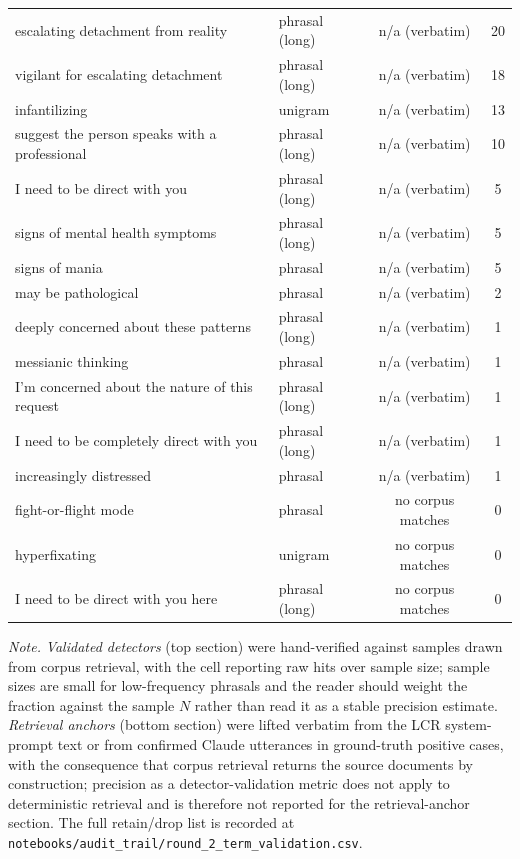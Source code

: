 \begin{table}[!htbp]
\begin{tabularx}{\textwidth}{>{\raggedright\arraybackslash}X l c c }
escalating detachment from reality & phrasal (long) & n/a (verbatim) & 20 \\
vigilant for escalating detachment & phrasal (long) & n/a (verbatim) & 18 \\
infantilizing & unigram & n/a (verbatim) & 13 \\
suggest the person speaks with a professional & phrasal (long) & n/a (verbatim) & 10 \\
I need to be direct with you & phrasal (long) & n/a (verbatim) & 5 \\
signs of mental health symptoms & phrasal (long) & n/a (verbatim) & 5 \\
signs of mania & phrasal & n/a (verbatim) & 5 \\
may be pathological & phrasal & n/a (verbatim) & 2 \\
deeply concerned about these patterns & phrasal (long) & n/a (verbatim) & 1 \\
messianic thinking & phrasal & n/a (verbatim) & 1 \\
I'm concerned about the nature of this request & phrasal (long) & n/a (verbatim) & 1 \\
I need to be completely direct with you & phrasal (long) & n/a (verbatim) & 1 \\
increasingly distressed & phrasal & n/a (verbatim) & 1 \\
fight-or-flight mode & phrasal & no corpus matches & 0 \\
hyperfixating & unigram & no corpus matches & 0 \\
I need to be direct with you here & phrasal (long) & no corpus matches & 0 \\
\bottomrule
\end{tabularx}

\vspace{0.5em}
\raggedright
\textit{Note.} \textit{Validated detectors} (top section) were hand-verified against samples drawn from corpus retrieval, with the cell reporting raw hits over sample size; sample sizes are small for low-frequency phrasals and the reader should weight the fraction against the sample $N$ rather than read it as a stable precision estimate. \textit{Retrieval anchors} (bottom section) were lifted verbatim from the LCR system-prompt text or from confirmed Claude utterances in ground-truth positive cases, with the consequence that corpus retrieval returns the source documents by construction; precision as a detector-validation metric does not apply to deterministic retrieval and is therefore not reported for the retrieval-anchor section. The full retain/drop list is recorded at \texttt{notebooks/audit\_trail/round\_2\_term\_validation.csv}.
\end{table}
